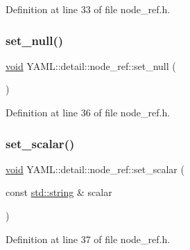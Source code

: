 Definition at line 33 of file node\+\_\+ref.\+h.

\mbox{\label{class_y_a_m_l_1_1detail_1_1node__ref_ad3ed986d33f37834b06f4bd308d6a445}} 
\subsubsection{\texorpdfstring{set\_null()}{set\_null()}}
{\footnotesize\ttfamily \mbox{\hyperlink{glad_8h_a950fc91edb4504f62f1c577bf4727c29}{void}} Y\+A\+M\+L\+::detail\+::node\+\_\+ref\+::set\+\_\+null (\begin{DoxyParamCaption}{ }\end{DoxyParamCaption})\hspace{0.3cm}{\ttfamily [inline]}}



Definition at line 36 of file node\+\_\+ref.\+h.

\mbox{\label{class_y_a_m_l_1_1detail_1_1node__ref_a1470f32bb2465b8d3c89a8c6de9d6242}} 
\subsubsection{\texorpdfstring{set\_scalar()}{set\_scalar()}}
{\footnotesize\ttfamily \mbox{\hyperlink{glad_8h_a950fc91edb4504f62f1c577bf4727c29}{void}} Y\+A\+M\+L\+::detail\+::node\+\_\+ref\+::set\+\_\+scalar (\begin{DoxyParamCaption}\item[{const \mbox{\hyperlink{glad_8h_ac83513893df92266f79a515488701770}{std\+::string}} \&}]{scalar }\end{DoxyParamCaption})\hspace{0.3cm}{\ttfamily [inline]}}



Definition at line 37 of file node\+\_\+ref.\+h.

\mbox{\label{class_y_a_m_l_1_1detail_1_1node__ref_a290c3d2fd8e4dee71698df521fb1521c}} 
